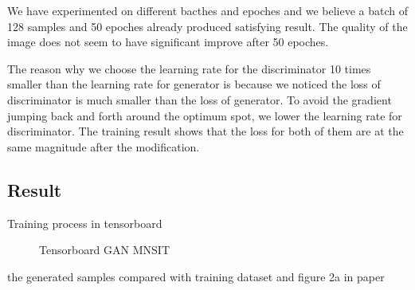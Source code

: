 \documentclass{article}
\begin{document}
We have experimented on different bacthes and epoches and we believe a batch of 128 samples and 50 epoches already produced satisfying result. 
The quality of the image does not seem to have significant improve after 50 epoches.

The reason why we choose the learning rate for the discriminator 10 times smaller than the learning rate for generator is 
because we noticed the loss of discriminator is much smaller than the loss of generator. 
To avoid the gradient jumping back and forth around the optimum spot, we lower the learning rate for discriminator.
The training result shows that the loss for both of them are at the same magnitude after the modification.

\subsection{Result}

Training process in tensorboard

\begin{figure}[!htb]
  \centering
  \caption{Tensorboard GAN MNSIT}
  \label{fig:TB_GAN_MNSIT}
\end{figure}

the generated samples compared with training dataset and figure 2a in paper
\end{document}
